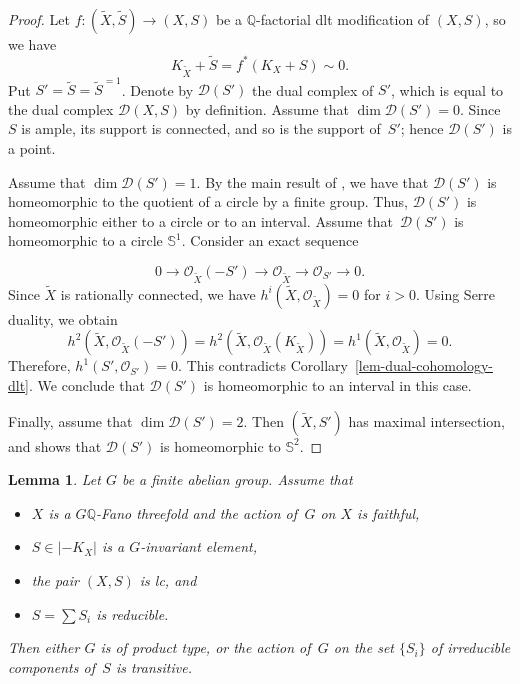 \documentclass[11pt]{amsart}
\numberwithin{equation}{section}
\newtheorem{lem}[thm]{Lemma}
\theoremstyle{definition}
\theoremstyle{remark}
\newcommand{\OOO}{\mathscr{O}}
\newcommand{\lra}{\longrightarrow}
\begin{document}
\begin{proof}
Let $f\colon (\widetilde{X}, \widetilde{S})\to (X, S)$ be a $\mathbb{Q}$-factorial 
dlt modification of $(X, S)$, so we have
\[
K_{\widetilde{X}}+\widetilde{S}= f^*(K_X+S)\sim 0.
\]  
Put $S'=\widetilde{S}=\widetilde{S}^{=1}$.  Denote by $\mathcal{D}(S')$ the dual complex of $S'$, which is equal to the dual complex $\mathcal{D}(X, S)$ by definition.  Assume that $\dim \mathcal{D}(S')=0$. Since $S$ is ample, its support is connected, and so is the support of~$S'$; hence $\mathcal{D}(S')$ is a point.

Assume that $\dim \mathcal{D}(S')=1$. By the main result of \cite{KX16}, we have that $\mathcal{D}(S')$ is homeomorphic to the quotient of a circle by a finite group. Thus, $\mathcal{D}(S')$ is homeomorphic either to a circle or to an interval. Assume that~$\mathcal{D}(S')$ is homeomorphic to a circle $\mathbb{S}^1$. 
Consider an exact sequence

\[
0 \lra \OOO_{\widetilde X}(-S') \lra \OOO_{\widetilde X} \lra \OOO_{S'} \lra 0.
\]
Since $\widetilde X$ is rationally connected, we have $h^i (\widetilde X, \OOO_{\widetilde X}) = 0$
for $i>0$. 
Using Serre duality, we obtain 
\[
h^2 \left(\widetilde X, \OOO_{\widetilde X}(-S')\right)=h^2 \left(\widetilde X, \OOO_{\widetilde X}(K_{\widetilde X})\right)=h^1 \left(\widetilde X, \OOO_{\widetilde X}\right)=0.
\] 
Therefore, $h^1 (S', \OOO_{S'}) = 0$. This contradicts Corollary~\ref{lem-dual-cohomology-dlt}. We conclude that $\mathcal{D}(S')$ is homeomorphic to an interval in this case. 
\color{black}

Finally, assume that $\dim \mathcal{D}(S')=2$. Then $(\widetilde X,S')$ has maximal intersection, and \cite[Section~33]{KX16} shows that $\mathcal{D}(S')$ is homeomorphic to $\mathbb S^2$.
\end{proof}

\begin{lem}
\label{lem-transitive-action}
Let $G$ be a finite abelian group. 
Assume that 
\begin{itemize}
\item
$X$ is a $G\mathbb{Q}$-Fano threefold and the action of\, $G$ on $X$ is faithful,
\item 
$S\in |-K_X|$ is a $G$-invariant element,
\item
the pair $(X, S)$ is lc, and 
\item
$S=\sum S_i$ is reducible. 
\end{itemize}
Then either $G$ is of product type, or the action of\, $G$ on the set $\{S_i\}$ of irreducible components of\, $S$ is transitive.
\end{lem}
\end{document}
